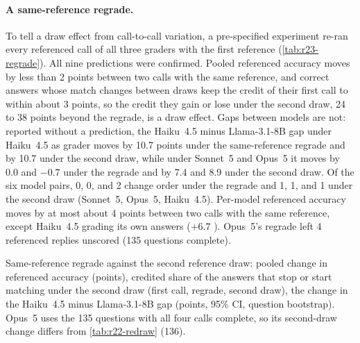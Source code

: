 \paragraph{A same-reference regrade.}
To tell a draw effect from call-to-call variation, a pre-specified experiment re-ran every referenced call of all three graders with the first reference (\cref{tab:r23-regrade}). All nine predictions were confirmed. Pooled referenced accuracy moves by less than 2 points between two calls with the same reference, and correct answers whose match changes between draws keep the credit of their first call to within about 3 points, so the credit they gain or lose under the second draw, 24 to 38 points beyond the regrade, is a draw effect. Gaps between models are not: reported without a prediction, the Haiku~4.5 minus Llama-3.1-8B gap under Haiku~4.5 as grader moves by 10.7 points under the same-reference regrade  and by 10.7 under the second draw, while under Sonnet~5 and Opus~5 it moves by 0.0 and $-0.7$ under the regrade and by 7.4 and 8.9 under the second draw. Of the six model pairs, 0, 0, and 2 change order under the regrade and 1, 1, and 1 under the second draw (Sonnet~5, Opus~5, Haiku~4.5). Per-model referenced accuracy moves by at most about 4 points between two calls with the same reference, except Haiku~4.5 grading its own answers ($+6.7$ ). Opus~5's regrade left 4 referenced replies unscored (135 questions complete).

\begin{table}[htbp]
\centering
\caption{Same-reference regrade against the second reference draw: pooled change in referenced accuracy (points), credited share of the answers that stop or start matching under the second draw (first call, regrade, second draw), the change in the Haiku~4.5 minus Llama-3.1-8B gap (points, 95\% CI, question bootstrap). Opus~5 uses the 135 questions with all four calls complete, so its second-draw change differs from \cref{tab:r22-redraw} (136).\pre}
\label{tab:r23-regrade}
\footnotesize
\setlength{\tabcolsep}{2pt}
\begin{adjustbox}{max width=\linewidth}\end{adjustbox}
\end{table}

